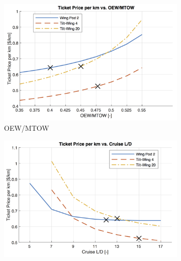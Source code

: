 \begin{figure}[h]
\begin{subfigure}[t]{0.33\textwidth}
    \captionsetup{justification=centering}
    \caption{}
    \label{fig:sens3}
\end{subfigure}
\captionsetup{justification=centering}
\caption{}
\label{fig:sens123}
\end{figure}


\begin{figure}[h]
\begin{subfigure}[t]{0.33\textwidth}
    \centering
    \includegraphics[width=\textwidth]{Figures/OEWMTOW_TPrice_perkmNOPAD.png}
    \captionsetup{justification=centering}
    \caption{OEW/MTOW}
    \label{fig:sens4}
\end{subfigure}
\begin{subfigure}[t]{0.33\textwidth}
    \centering
    \includegraphics[width=\textwidth]{Figures/LoD_TPrice_perkmNOPAD.png}
    \captionsetup{justification=centering}
    \caption{}
    \label{fig:sens5}

\end{subfigure}
\end{figure}
